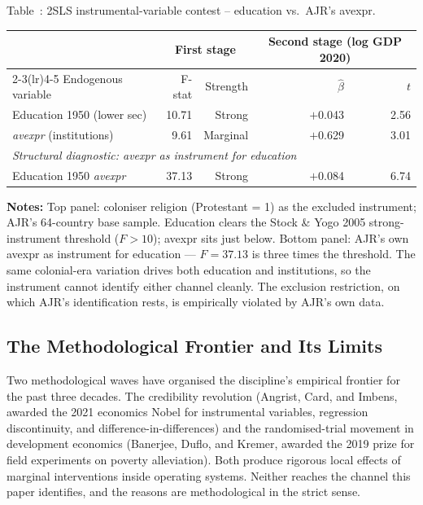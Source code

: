 \documentclass[12pt,letterpaper]{article}
\begin{document}
{\label{tab:a7}Table~\thetable: 2SLS instrumental-variable contest -- education vs.~AJR's avexpr.

{\small
\begin{longtable}[]{@{}lrrrr@{}}
\toprule
 & \multicolumn{2}{c}{First stage} & \multicolumn{2}{c}{Second stage (log GDP 2020)} \\
\cmidrule(lr){2-3}\cmidrule(lr){4-5}
Endogenous variable & F-stat & Strength & $\hat\beta$ & $t$ \\
\midrule
\endhead
Education 1950 (lower sec) & 10.71 & Strong & $+$0.043 & 2.56 \\
\emph{avexpr} (institutions) & 9.61 & Marginal & $+$0.629 & 3.01 \\
\midrule
\multicolumn{5}{l}{\emph{Structural diagnostic: avexpr as instrument for education}} \\
Education 1950 \textbar{} \emph{avexpr} & 37.13 & Strong & $+$0.084 & 6.74 \\
\bottomrule
\end{longtable}
}

\begin{minipage}{\dimexpr\textwidth-2em}
\scriptsize
\textbf{Notes:} Top panel: coloniser religion (Protestant = 1) as the
excluded instrument; AJR's 64-country base sample. Education clears
the Stock \& Yogo 2005 strong-instrument threshold ($F>10$); avexpr
sits just below. Bottom panel: AJR's own avexpr as instrument for
education --- $F=37.13$ is three times the threshold. The same
colonial-era variation drives both education and institutions, so the
instrument cannot identify either channel cleanly. The exclusion
restriction, on which AJR's identification rests, is empirically
violated by AJR's own data.
\end{minipage}

\subsection{The Methodological Frontier and Its Limits}\label{methodological-frontier}

Two methodological waves have organised the discipline's empirical
frontier for the past three decades. The credibility revolution
(Angrist, Card, and Imbens, awarded the 2021 economics Nobel for
instrumental variables, regression discontinuity, and
difference-in-differences) and the randomised-trial movement in
development economics (Banerjee, Duflo, and Kremer, awarded the 2019
prize for field experiments on poverty alleviation). Both produce
rigorous local effects of marginal interventions inside operating
systems. Neither reaches the channel this paper identifies, and the
reasons are methodological in the strict sense.

}
\end{document}
